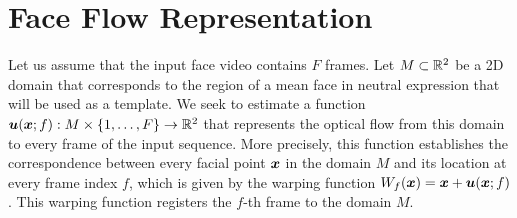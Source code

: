 \section{Face Flow Representation}\label{sec:face_flow_method}
Let us assume that the input face video contains $F$ frames. Let $M\subset\mathbb{R}^2$
be a 2D domain that corresponds to the region of a mean face in neutral expression
that will be used as a template. We seek to estimate a function
$\boldsymbol{u}(\boldsymbol{x};f) : M\times \{1,\ldots,F\} \rightarrow \mathbb{R}^2$ that represents the
optical flow from this domain to every frame of the input sequence.
More precisely, this function establishes the correspondence between every
facial point $\boldsymbol{x}$ in the domain $M$ and its location at every frame index $f$,
which is given by the warping function $W_f(\boldsymbol{x})=\boldsymbol{x}+\boldsymbol{u}(\boldsymbol{x};f)$. This warping
function registers the $f$-th frame to the domain $M$.

